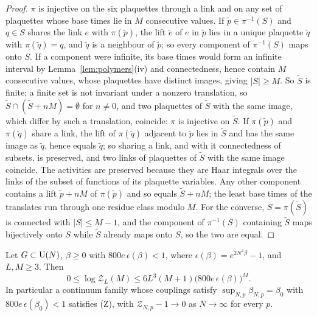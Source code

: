 \begin{proof}
$\pi$ is injective on the six plaquettes through a link and on any set of
plaquettes whose base times lie in $M$ consecutive values. If $\tilde p\in
\pi^{-1}(S)$ and $q\in S$ shares the link $e$ with $\pi(\tilde p)$, the lift
$\tilde e$ of $e$ in $\tilde p$ lies in a unique plaquette $\tilde q$ with
$\pi(\tilde q)=q$, and $\tilde q$ is a neighbour of $\tilde p$; so every
component of $\pi^{-1}(S)$ maps onto $S$. If a component were infinite, its
base times would form an infinite interval by Lemma~\ref{lem:polymers}(iv)
and connectedness, hence contain $M$ consecutive values, whose plaquettes
have distinct images, giving $|S|\ge M$. So $\tilde S$ is finite; a finite
set is not invariant under a nonzero translation, so $\tilde S\cap(\tilde
S+nM)=\emptyset$ for $n\ne0$, and two plaquettes of $\tilde S$ with the
same image, which differ by such a translation, coincide: $\pi$ is
injective on $\tilde S$. If $\pi(\tilde p)$ and $\pi(\tilde q)$ share a
link, the lift of $\pi(\tilde q)$ adjacent to $\tilde p$ lies in $\tilde S$
and has the same image as $\tilde q$, hence equals $\tilde q$; so sharing a
link, and with it connectedness of subsets, is preserved, and two links of
plaquettes of $\tilde S$ with the same image coincide. The activities are
preserved because they are Haar integrals over the links of the subset of
functions of its plaquette variables. Any other component contains a lift
$\tilde p+nM$ of $\pi(\tilde p)$ and so equals $\tilde S+nM$; the least base
times of the translates run through one residue class modulo $M$. For the
converse, $S=\pi(\tilde S)$ is connected with $|S|\le M-1$, and the component
of $\pi^{-1}(S)$ containing $\tilde S$ maps bijectively onto $S$ while
$\tilde S$ already maps onto $S$, so the two are equal.
\end{proof}

\begin{proposition}\label{prop:Zstrong}
Let $G\subset\mathrm{U}(N)$, $\beta\ge0$ with $800e\,\epsilon(\beta)<1$, where
$\epsilon(\beta)=e^{2N^2\beta}-1$, and $L,M\ge3$. Then
\[
0\le\log\mathcal Z_L(M)\le6L^3(M+1)\bigl(800e\,\epsilon(\beta)\bigr)^M .
\]
In particular a continuum family whose couplings satisfy $\sup_{N,p}
\beta_{N,p}=\beta_0$ with $800e\,\epsilon(\beta_0)<1$ satisfies \textup{(Z)},
with $\mathcal Z_{N,p}-1\to0$ as $N\to\infty$ for every $p$.
\end{proposition}

